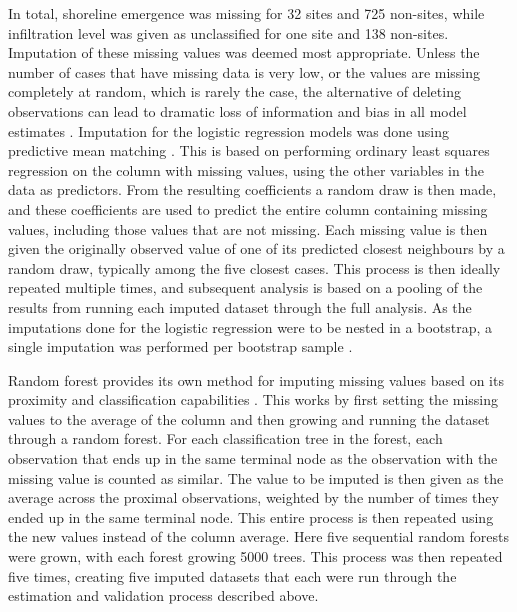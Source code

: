 \documentclass[12pt, a4paper]{article}
\begin{document}
In total, shoreline emergence was missing for 32 sites and 725 non-sites, while infiltration level was given as unclassified for one site and 138 non-sites. Imputation of these missing values was deemed most appropriate. Unless the number of cases that have missing data is very low, or the values are missing completely at random, which is rarely the case, the alternative of deleting observations can lead to dramatic loss of information and bias in all model estimates \citep[][]{nakagawa2008}. Imputation for the logistic regression models was done using predictive mean matching \citep{buuren2011}. This is based on performing ordinary least squares regression on the column with missing values, using the other variables in the data as predictors. From the resulting coefficients a random draw is then made, and these coefficients are used to predict the entire column containing missing values, including those values that are not missing. Each missing value is then given the originally observed value of one of its predicted closest neighbours by a random draw, typically among the five closest cases. This process is then ideally repeated multiple times, and subsequent analysis is based on a pooling of the results from running each imputed dataset through the full analysis. As the imputations done for the logistic regression were to be nested in a bootstrap, a single imputation was performed per bootstrap sample \citep{brand2018}. \par
Random forest provides its own method for imputing missing values based on its proximity and classification capabilities \citep{breiman2003}. This works by first setting the missing values to the average of the column and then growing and running the dataset through a random forest. For each classification tree in the forest, each observation that ends up in the same terminal node as the observation with the missing value is counted as similar. The value to be imputed is then given as the average across the proximal observations, weighted by the number of times they ended up in the same terminal node. This entire process is then repeated using the new values instead of the column average. Here five sequential random forests were grown, with each forest growing 5000 trees. This process was then repeated five times, creating five imputed datasets that each were run through the estimation and validation process described above.\par 
\end{document}
